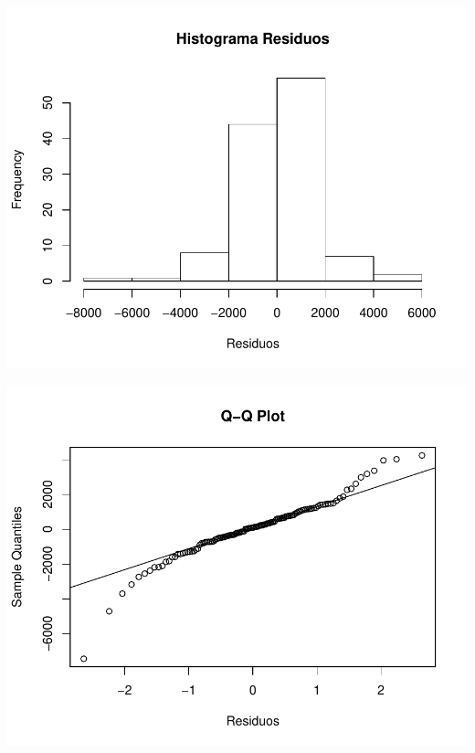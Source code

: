 \documentclass[11pt,a4paper,oneside]{article}\usepackage[]{graphicx}\usepackage[]{color}
\makeatletter
\def\maxwidth{ %
  \ifdim\Gin@nat@width>\linewidth
    \linewidth
  \else
    \Gin@nat@width
  \fi
}
\newenvironment{knitrout}{}{} %
\makeatother
\begin{document}
\begin{knitrout}
{\centering \includegraphics[width=\maxwidth]{figure/unnamed-chunk-16-41} 

}




{\centering \includegraphics[width=\maxwidth]{figure/unnamed-chunk-16-42} 

}





\end{knitrout}
\end{document}
